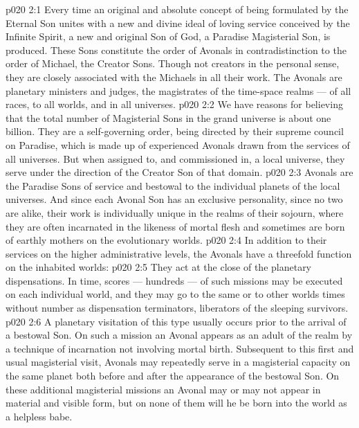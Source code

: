 \vs p020 2:1 Every time an original and absolute concept of being formulated by the Eternal Son unites with a new and divine ideal of loving service conceived by the Infinite Spirit, a new and original Son of God, a Paradise Magisterial Son, is produced. These Sons constitute the order of Avonals in contradistinction to the order of Michael, the Creator Sons. Though not creators in the personal sense, they are closely associated with the Michaels in all their work. The Avonals are planetary ministers and judges, the magistrates of the time\hyp{}space realms --- of all races, to all worlds, and in all universes.
\vs p020 2:2 We have reasons for believing that the total number of Magisterial Sons in the grand universe is about one billion. They are a self\hyp{}governing order, being directed by their supreme council on Paradise, which is made up of experienced Avonals drawn from the services of all universes. But when assigned to, and commissioned in, a local universe, they serve under the direction of the Creator Son of that domain.
\vs p020 2:3 Avonals are the Paradise Sons of service and bestowal to the individual planets of the local universes. And since each Avonal Son has an exclusive personality, since no two are alike, their work is individually unique in the realms of their sojourn, where they are often incarnated in the likeness of mortal flesh and sometimes are born of earthly mothers on the evolutionary worlds.
\vs p020 2:4 \pc In addition to their services on the higher administrative levels, the Avonals have a threefold function on the inhabited worlds:
\vs p020 2:5 \bibnobreakspace {} They act at the close of the planetary dispensations. In time, scores --- hundreds --- of such missions may be executed on each individual world, and they may go to the same or to other worlds times without number as dispensation terminators, liberators of the sleeping survivors.
\vs p020 2:6 \pc {}\bibnobreakspace {} A planetary visitation of this type usually occurs prior to the arrival of a bestowal Son. On such a mission an Avonal appears as an adult of the realm by a technique of incarnation not involving mortal birth. Subsequent to this first and usual magisterial visit, Avonals may repeatedly serve in a magisterial capacity on the same planet both before and after the appearance of the bestowal Son. On these additional magisterial missions an Avonal may or may not appear in material and visible form, but on none of them will he be born into the world as a helpless babe.
